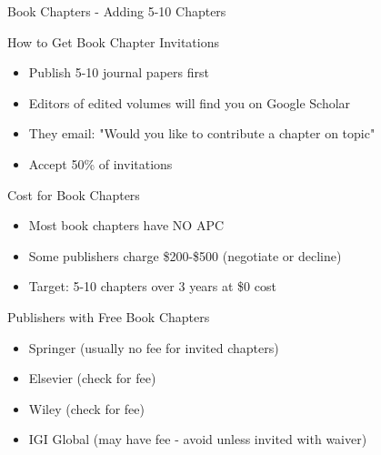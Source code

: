 \documentclass[11pt]{beamer}
\begin{document}
	\begin{frame}{Book Chapters - Adding 5-10 Chapters}
		\scriptsize
		\begin{block}{How to Get Book Chapter Invitations}
			\begin{itemize}
				\item Publish 5-10 journal papers first
				\item Editors of edited volumes will find you on Google Scholar
				\item They email: "Would you like to contribute a chapter on topic"
				\item Accept 50\% of invitations
			\end{itemize}
		\end{block}
		\begin{block}{Cost for Book Chapters}
			\begin{itemize}
				\item Most book chapters have NO APC
				\item Some publishers charge \$200-\$500 (negotiate or decline)
				\item Target: 5-10 chapters over 3 years at \$0 cost
			\end{itemize}
		\end{block}
		\begin{block}{Publishers with Free Book Chapters}
			\begin{itemize}
				\item Springer (usually no fee for invited chapters)
				\item Elsevier (check for fee)
				\item Wiley (check for fee)
				\item IGI Global (may have fee - avoid unless invited with waiver)
			\end{itemize}
		\end{block}
	\end{frame}
	
\end{document}

